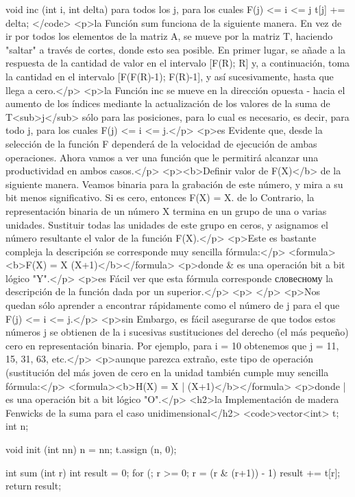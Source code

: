 void inc (int i, int delta)
{
para todos los j, para los cuales F(j) <= i <= j
{
t[j] += delta;
}
}</code>
<p>la Función sum funciona de la siguiente manera. En vez de ir por todos los elementos de la matriz A, se mueve por la matriz T, haciendo "saltar" a través de cortes, donde esto sea posible. En primer lugar, se añade a la respuesta de la cantidad de valor en el intervalo [F(R); R] y, a continuación, toma la cantidad en el intervalo [F(F(R)-1); F(R)-1], y así sucesivamente, hasta que llega a cero.</p>
<p>la Función inc se mueve en la dirección opuesta - hacia el aumento de los índices mediante la actualización de los valores de la suma de T<sub>j</sub> sólo para las posiciones, para lo cual es necesario, es decir, para todo j, para los cuales F(j) <= i <= j.</p>
<p>es Evidente que, desde la selección de la función F dependerá de la velocidad de ejecución de ambas operaciones. Ahora vamos a ver una función que le permitirá alcanzar una productividad en ambos casos.</p>
<p><b>Definir valor de F(X)</b> de la siguiente manera. Veamos binaria para la grabación de este número, y mira a su bit menos significativo. Si es cero, entonces F(X) = X. de lo Contrario, la representación binaria de un número X termina en un grupo de una o varias unidades. Sustituir todas las unidades de este grupo en ceros, y asignamos el número resultante el valor de la función F(X).</p>
<p>Este es bastante compleja la descripción se corresponde muy sencilla fórmula:</p>
<formula><b>F(X) = X (X+1)</b></formula>
<p>donde & es una operación bit a bit lógico "Y".</p>
<p>es Fácil ver que esta fórmula corresponde словесному la descripción de la función dada por un superior.</p>
<p> </p>
<p>Nos quedan sólo aprender a encontrar rápidamente como el número de j para el que F(j) <= i <= j.</p>
<p>sin Embargo, es fácil asegurarse de que todos estos números j se obtienen de la i sucesivas sustituciones del derecho (el más pequeño) cero en representación binaria. Por ejemplo, para i = 10 obtenemos que j = 11, 15, 31, 63, etc.</p>
<p>aunque parezca extraño, este tipo de operación (sustitución del más joven de cero en la unidad también cumple muy sencilla fórmula:</p>
<formula><b>H(X) = X | (X+1)</b></formula>
<p>donde | es una operación bit a bit lógico "O".</p>
<h2>la Implementación de madera Fenwicks de la suma para el caso unidimensional</h2>
<code>vector<int> t;
int n;

void init (int nn)
{
n = nn;
t.assign (n, 0);
}

int sum (int r)
{
int result = 0;
for (; r >= 0; r = (r & (r+1)) - 1)
result += t[r];
return result;
}

